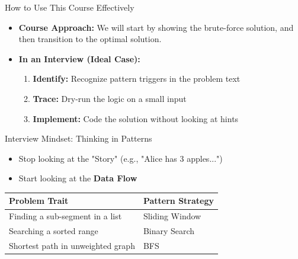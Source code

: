 \begin{frame}{How to Use This Course Effectively}
  \begin{itemize}
    \item \textbf{Course Approach:} We will start by showing the brute-force solution, and then transition to the optimal solution.
    \item \textbf{In an Interview (Ideal Case):}
      \begin{enumerate}
        \item \textbf{Identify:} Recognize pattern triggers in the problem text
        \item \textbf{Trace:} Dry-run the logic on a small input
        \item \textbf{Implement:} Code the solution without looking at hints
      \end{enumerate}
  \end{itemize}
\end{frame}

\begin{frame}{Interview Mindset: Thinking in Patterns}
  \begin{itemize}
    \item Stop looking at the "Story" (e.g., "Alice has 3 apples...")
    \item Start looking at the \textbf{Data Flow}
  \end{itemize}
  
  \begin{table}[]
    \scriptsize
    \begin{tabular}{ll}
        \toprule
        \textbf{Problem Trait} & \textbf{Pattern Strategy} \\ \midrule
        Finding a sub-segment in a list & Sliding Window \\
        Searching a sorted range & Binary Search \\
        Shortest path in unweighted graph & BFS \\ \bottomrule
    \end{tabular}
  \end{table}
\end{frame}
  


